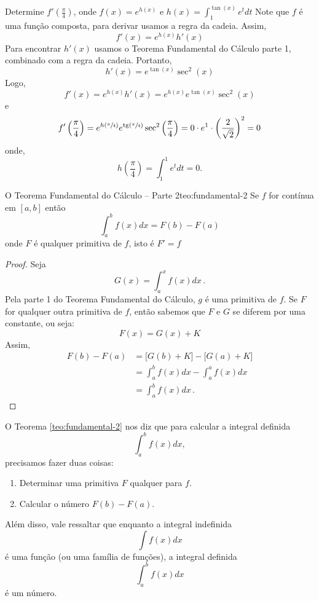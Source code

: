 \begin{example}
  Determine
  \(f'\left(\frac{\pi}{4}\right)\), onde
  \(f(x)= e^{h(x)}\) e
  \(h(x)= \int^{\tan(x)}_1 e^t dt\)
  \solution
  Note que $f$ é uma função composta, para derivar usamos a regra da cadeia.
  Assim,
  \[
    f'(x)= e^{h(x)}h'(x)
  \]
  Para encontrar $h'(x)$ usamos o Teorema Fundamental do Cálculo parte 1,
  combinado com a regra da cadeia. Portanto,
  \[
    h'(x)=e^{\tan(x)}\sec^2(x)
  \]
  Logo,
  \[
    f'(x)
    = e^{h(x)}h'(x)
    =e^{h(x)}e^{\tan(x)}\sec^2(x)
  \]
  e
  \[
    f'\left(\frac{\pi}{4}\right)
    = e^{h(\sfrac{\pi}{4})}
      e^{\operatorname{tg}(\sfrac{\pi}{4})}
      \sec^2\left(\frac{\pi}{4}\right)
    = 0 \cdot e^1 \cdot \left(\frac{2}{\sqrt{2}}\right)^2=0
  \]
  onde,
  \[
    h\left(\frac{\pi}{4} \right)= \int_1^1 e^t dt=0.
  \]
\end{example}

\begin{teorema}{O Teorema Fundamental do Cálculo -- Parte 2}{teo:fundamental-2}
  Se $f$ for contínua em $[a, b]$ então
  \[
    \int_a^{b}f(x)dx= F(b)-F(a)
  \]
  onde $F$ é qualquer primitiva de $f$, isto é $F'=f$
\end{teorema}

\begin{proof}
  Seja
  \[
    G(x)= \int_a^x f(x)dx \,.
  \]
  Pela parte 1 do Teorema Fundamental do Cálculo,
  $g$ é uma primitiva de $f$. Se $F$ for qualquer outra primitiva de $f$,
  então sabemos que $F$ e $G$ se diferem por uma constante, ou seja:
  \[
      F(x)= G(x)+K
  \]
  Assim,
  \begin{align*}
    F(b)-F(a)
      & = \big[ G(b) + K \big]
        - \big[ G(a) + K \big] \\
      & = \int_a^b f(x)dx -  \int_a^a f(x)dx \\
      & = \int_a^b f(x)dx \,.
  \end{align*}
\end{proof}

O Teorema \ref{teo:fundamental-2} nos diz que para calcular a integral
definida
\[\int_a^b f(x)dx,\]
precisamos fazer duas coisas:
\begin{enumerate}
    \item Determinar uma primitiva $F$ qualquer para $f$.
    \item Calcular o número $F(b)-F(a)$.
\end{enumerate}
Além disso, vale ressaltar que enquanto a integral indefinida
\[\int f(x)dx\]
é uma função (ou uma família de funções),
a integral definida
\[\int_a^b f(x)dx\]
é um número.

